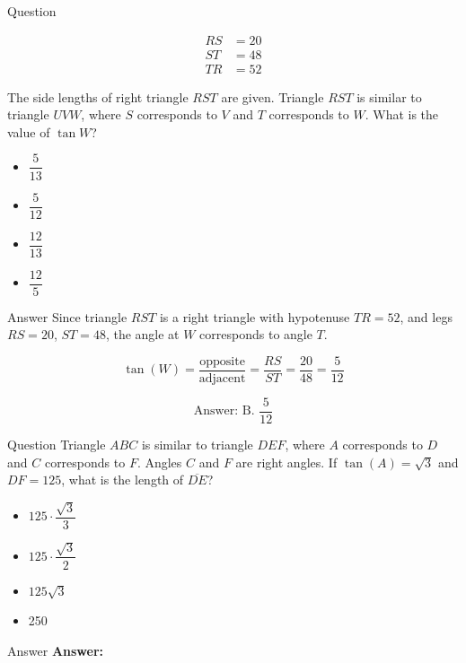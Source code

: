 \documentclass{beamer}
\begin{document}
\begin{frame}{Question}


\begin{align*}
RS &= 20 \\
ST &= 48 \\
TR &= 52
\end{align*}

The side lengths of right triangle $RST$ are given. Triangle $RST$ is similar to triangle $UVW$, where $S$ corresponds to $V$ and $T$ corresponds to $W$. What is the value of $\tan W$?

\begin{itemize}
  \item[A.] $\dfrac{5}{13}$
  \item[B.] $\dfrac{5}{12}$
  \item[C.] $\dfrac{12}{13}$
  \item[D.] $\dfrac{12}{5}$
\end{itemize}
\end{frame}

\begin{frame}{Answer}
Since triangle $RST$ is a right triangle with hypotenuse $TR = 52$, and legs $RS = 20$, $ST = 48$, the angle at $W$ corresponds to angle $T$.

\[
\tan(W) = \frac{\text{opposite}}{\text{adjacent}} = \frac{RS}{ST} = \frac{20}{48} = \frac{5}{12}
\]

\[
\boxed{\text{Answer: B. } \frac{5}{12}}
\]
\end{frame}

\begin{frame}{Question}
Triangle $ABC$ is similar to triangle $DEF$, where $A$ corresponds to $D$ and $C$ corresponds to $F$. Angles $C$ and $F$ are right angles. If $\tan(A) = \sqrt{3}$ and $DF = 125$, what is the length of $\overline{DE}$?

\begin{itemize}
    \item[A.] $125 \cdot \dfrac{\sqrt{3}}{3}$
    \item[B.] $125 \cdot \dfrac{\sqrt{3}}{2}$
    \item[C.] $125\sqrt{3}$
    \item[D.] 250
\end{itemize}
\end{frame}






\begin{frame}{Answer}
\textbf{Answer:} \quad {}
\end{frame}
\end{document}
